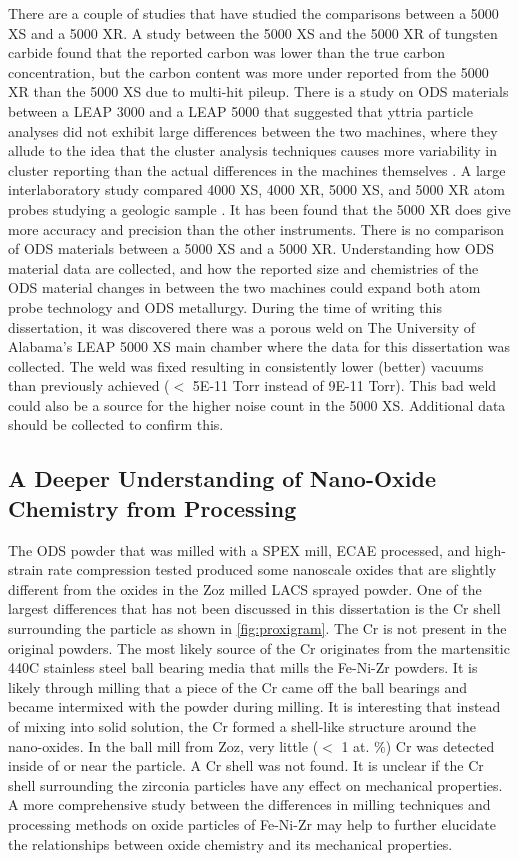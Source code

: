 		
		
		There are a couple of studies that have studied the comparisons between a 5000 XS and a 5000 XR. A study between the 5000 XS and the 5000 XR of tungsten carbide found that the reported carbon was lower than the true carbon concentration, but the carbon content was more under reported from the 5000 XR than the 5000 XS \cite{RN3430} due to multi-hit pileup. There is a study on ODS materials between a LEAP 3000 and a LEAP 5000 that suggested that yttria particle analyses did not exhibit large differences between the two machines, where they allude to the idea that the cluster analysis techniques causes more variability in cluster reporting than the actual differences in the machines themselves \cite{RN2597}. A large interlaboratory study compared 4000 XS, 4000 XR, 5000 XS, and 5000 XR atom probes studying a geologic sample \cite{RN3444}. It has been found that the 5000 XR does give more accuracy and precision than the other instruments. There is no comparison of ODS materials between a 5000 XS and a 5000 XR. Understanding how ODS material data are collected, and how the reported size and chemistries of the ODS material changes in between the two machines could expand both atom probe technology and ODS metallurgy. During the time of writing this dissertation, it was discovered there was a porous weld on The University of Alabama’s LEAP 5000 XS main chamber where the data for this dissertation was collected. The weld was fixed resulting in consistently lower (better) vacuums than previously achieved ($<$ 5E-11 Torr instead of 9E-11 Torr). This bad weld could also be a source for the higher noise count in the 5000 XS. Additional data should be collected to confirm this.
	
	\subsection*{A Deeper Understanding of Nano-Oxide Chemistry from Processing}	
		The ODS powder that was milled with a SPEX mill, ECAE processed, and high-strain rate compression tested produced some nanoscale oxides that are slightly different from the oxides in the Zoz milled LACS sprayed powder. One of the largest differences that has not been discussed in this dissertation is the Cr shell surrounding the particle as shown in \ref{fig:proxigram}. The Cr is not present in the original powders. The most likely source of the Cr originates from the martensitic 440C stainless steel ball bearing media that mills the Fe-Ni-Zr powders. It is likely through milling that a piece of the Cr came off the ball bearings and became intermixed with the powder during milling. It is interesting that instead of mixing into solid solution, the Cr formed a shell-like structure around the nano-oxides. In the ball mill from Zoz, very little ($<$ 1 at. $\%$) Cr was detected inside of or near the particle. A Cr shell was not found. It is unclear if the Cr shell surrounding the zirconia particles have any effect on mechanical properties. A more comprehensive study between the differences in milling techniques and processing methods on oxide particles of Fe-Ni-Zr may help to further elucidate the relationships between oxide chemistry and its mechanical properties.
		
